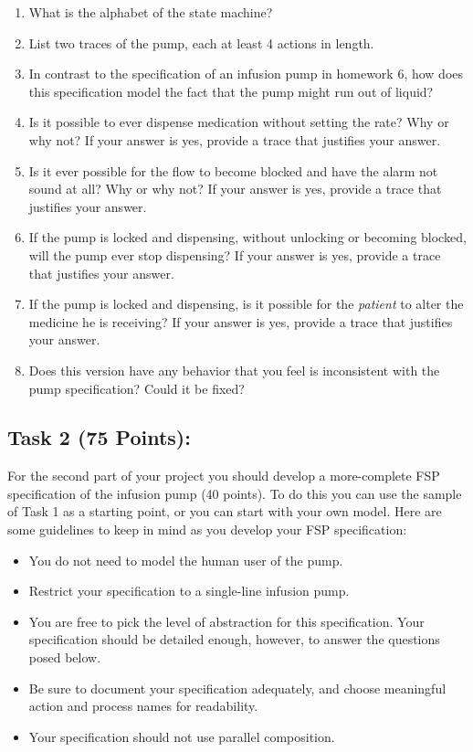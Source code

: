 \documentclass{article}
\newcommand{\head}{\subsection*}
\begin{document}
\begin{enumerate}
    \item What is the alphabet of the state machine?
    \item List two traces of the pump, each at least 4 actions in length.
    \item In contrast to the specification of an infusion pump in homework 6, how does this specification model the fact that     the pump might run out of liquid?
    \item Is it possible to ever dispense medication without setting the rate?  Why or why not? If your answer is yes, provide a trace that justifies your answer.
    \item Is it ever possible for the flow to become blocked and have the alarm not sound at all?  Why or why not? If your answer is yes, provide a trace that justifies your answer.
    \item If the pump is locked and dispensing, without unlocking or becoming blocked, will the pump ever stop dispensing? If your answer is yes, provide a trace that justifies your answer.
    \item If the pump is locked and dispensing, is it possible for the \emph{patient} to alter the medicine he is receiving? If your answer is yes, provide a trace that justifies your answer.
    \item Does this version have any behavior that you feel is inconsistent with the pump specification? Could it be fixed?
\end{enumerate}

\head{Task 2 (75 Points):}

For the second part of your project you should develop a
more-complete FSP specification of the infusion pump (40 points). To
do this you can use the sample of Task 1 as a starting point, or you
can start with your own model. Here are some guidelines to keep in
mind as you develop your FSP specification:

\begin{itemize}
\item You do not need to model the human user of the pump.

\item Restrict your specification to a single-line infusion pump.

\item You are free to pick the level of abstraction for this specification. Your specification
should be detailed enough, however, to answer the questions posed below.

\item Be sure to document your specification adequately, and choose meaningful action and process names for readability.

\item Your specification should not use parallel composition.

\end{itemize}
\end{document}
